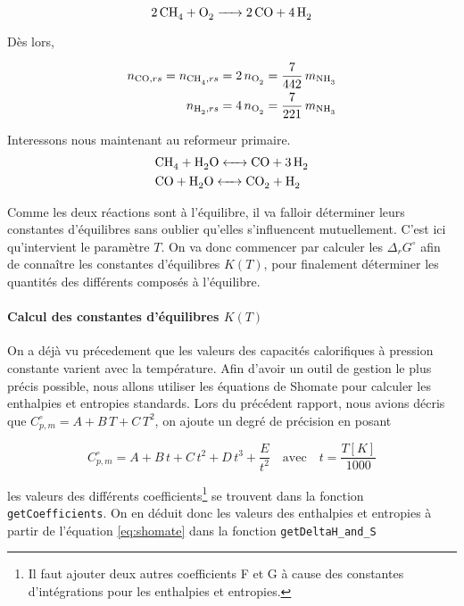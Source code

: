 \begin{equation*}
	\ce{2CH4 + O2 -> 2CO + 4H2}
\end{equation*}

Dès lors, 

\begin{align}
	n_{\ce{CO}, rs} = n_{\ce{CH4}, rs} 
	= 2 \, n_{\ce{O2}} = \frac{7}{442} \, m_{\ce{NH3}} 
	\label{eq:moles1_ref_sec} \\
	n_{\ce{H2}, rs} = 4 \, n_{\ce{O2}} = \frac{7}{221} \, m_{\ce{NH3}}
	\label{eq:moles2_ref_sec}
\end{align}

Interessons nous maintenant au reformeur primaire.
\begin{align*}
	&\ce{CH4 + H2O <-> CO + 3H2} \\
	&\ce{CO + H2O <-> CO2 + H2}
\end{align*}

Comme les deux réactions sont à l'équilibre,
il va falloir déterminer leurs constantes d'équilibres sans
oublier qu'elles s'influencent mutuellement.
C'est ici qu'intervient le paramètre $T$. On va donc commencer
par calculer les $\Delta_r G^{\circ}$ afin de conna\^itre les constantes
d'équilibres $K(T)$, pour finalement déterminer les quantités des différents composés
à l'équilibre.

\paragraph{Calcul des constantes d'équilibres $K(T)$}

On a déjà vu précedement que les valeurs des capacités calorifiques
à pression constante varient avec la température. Afin d'avoir un outil de gestion
le plus précis possible, nous allons utiliser les équations de Shomate pour calculer 
les enthalpies et entropies standards. 
Lors du précédent rapport, nous avions décris que $C_{p,m}^{\circ} = A + B \, T + C \, T^2$,
on ajoute un degré de précision en posant

\begin{equation}
	C_{p,m}^{\circ} = A + B \, t + C \, t^2 + D \, t^3 + \frac{E}{t^2}
	\quad \text{avec} \quad t = \frac{T[K]}{1000}
	\label{eq:shomate}
\end{equation}

les valeurs des différents coefficients\footnote{Il faut ajouter deux autres 
coefficients F et G à cause des constantes d'intégrations pour les
enthalpies et entropies.} 
se trouvent \cite{shomate} dans la fonction \texttt{getCoefficients}.
On en déduit donc les valeurs des enthalpies et entropies
à partir de l'équation \ref{eq:shomate} dans la fonction \texttt{getDeltaH\_and\_S}  

